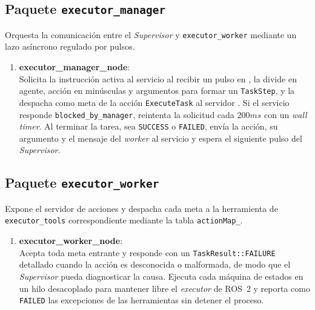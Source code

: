 \subsection{Paquete \texttt{executor\_manager}}
\label{subsec:executor_manager}

Orquesta la comunicación entre el \textit{Supervisor} y \texttt{executor\_worker} mediante un lazo asíncrono regulado por pulsos.

\begin{enumerate}
    \item \textbf{executor\_manager\_node}: \\
    Solicita la instrucción activa al servicio  al recibir un pulso en , la divide en agente, acción en minúsculas y argumentos para formar un \texttt{TaskStep}, y la despacha como meta de la acción \texttt{ExecuteTask} al servidor . Si el servicio responde \texttt{blocked\_by\_manager}, reintenta la solicitud cada $200ms$ con un \textit{wall timer}. Al terminar la tarea, sea \texttt{SUCCESS} o \texttt{FAILED}, envía la acción, su argumento y el mensaje del \textit{worker} al servicio  y espera el siguiente pulso del \textit{Supervisor}.
\end{enumerate}

\subsection{Paquete \texttt{executor\_worker}}
\label{subsec:executor_worker}

Expone el servidor de acciones  y despacha cada meta a la herramienta de \texttt{executor\_tools} correspondiente mediante la tabla \texttt{actionMap\_}.

\begin{enumerate}
    \item \textbf{executor\_worker\_node}: \\
    Acepta toda meta entrante y responde con un \texttt{TaskResult::FAILURE} detallado cuando la acción es desconocida o malformada, de modo que el \textit{Supervisor} pueda diagnosticar la causa. Ejecuta cada máquina de estados en un hilo desacoplado para mantener libre el \textit{executor} de ROS~2 y reporta como \texttt{FAILED} las excepciones de las herramientas sin detener el proceso.
\end{enumerate}

